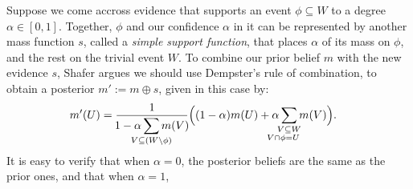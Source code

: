 \begin{example}
Suppose we come accross evidence that supports an event $\phi 
\subseteq W$ to a degree $\alpha \in [0,1]$.
Together, $\phi$ and our confidence $\alpha$ in it
can be represented by another mass function $s$,
called a \emph{simple support function},
that places $\alpha$ of its mass on $\phi$, and the rest on the trivial event $W$.
%
%
To combine our prior belief $m$ with the new evidence $s$,
Shafer argues we should use Dempster's rule of combination,
to obtain a posterior $m' := m \oplus s$, 
given in this case by:
\begin{align*}
 	m'(U) &= 
	\frac{1}{\!\displaystyle 1 - \alpha \sum_{\mathclap{V \subseteq (W \setminus \phi)}} m(V)\!}
	\Big(
	(1-\alpha) m(U) + 
	\alpha \sum_{\substack{\mathclap{V \subseteq W} \\ \mathllap{V \cap \phi} = \mathrlap{U}}} m(V) 
		\Big).
\end{align*}
It is easy to verify that when $\alpha = 0$, the posterior beliefs are the same as the
prior ones, and that when $\alpha = 1$,

\end{example}
